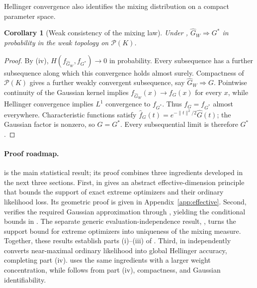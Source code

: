 \documentclass[11pt]{article}
\newtheorem{corollary}[corollary]{Corollary}
\theoremstyle{definition}
\theoremstyle{remark}
\newcommand{\Pcal}{\mathcal P}
\newcommand{\norm}[1]{\lVert #1\rVert}
\newcommand{\Ghat}{\widehat G}
\begin{document}
Hellinger convergence also identifies the mixing distribution on a compact
parameter space.

\begin{corollary}[Weak consistency of the mixing law]
\label{cor:weak}
Under , $\Ghat_W\Rightarrow G^*$ in probability in the weak
topology on $\Pcal(K)$.
\end{corollary}

\begin{proof}
By (iv), $H(f_{\Ghat_W},f_{G^*})\to0$ in probability.  Every
subsequence has a further subsequence along which this convergence holds
almost surely.  Compactness of $\Pcal(K)$ gives a further weakly convergent
subsequence, say $\Ghat_W\Rightarrow G$.  Pointwise continuity of the
Gaussian kernel implies $f_{\Ghat_W}(x)\to f_G(x)$ for every $x$, while
Hellinger convergence implies $L^1$ convergence to $f_{G^*}$.  Thus
$f_G=f_{G^*}$ almost everywhere.  Characteristic functions satisfy
$\widehat f_G(t)=e^{-\norm{t}^2/2}\widehat G(t)$; the Gaussian factor is
nonzero, so $G=G^*$.  Every subsequential limit is therefore $G^*$.
\end{proof}

\paragraph{Proof roadmap.}
 is the main statistical result; its proof combines three
ingredients developed in the next three sections.  First,
 in  gives an abstract
effective-dimension principle that bounds the support of exact extreme
optimizers and their ordinary likelihood loss.  Its geometric proof is given
in Appendix~\ref{app:effective}.  Second,  verifies the required
Gaussian approximation through , yielding the
conditional bounds in .  The separate generic
evaluation-independence result, , turns the support bound
for extreme optimizers into uniqueness of the mixing measure.  Together,
these results establish parts (i)--(iii) of .  Third,
 in  independently converts
near-maximal ordinary likelihood into global Hellinger accuracy, completing
part (iv).   uses the same ingredients with a larger weight
concentration, while  follows from part (iv), compactness, and
Gaussian identifiability.
\end{document}
